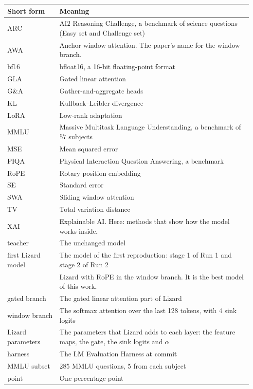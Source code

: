 
\begin{center}
\small
\begin{tabularx}{\linewidth}{@{}lL@{}}
\toprule
\textbf{Short form} & \textbf{Meaning} \\
\midrule
ARC & AI2 Reasoning Challenge, a benchmark of science questions (Easy set and Challenge set) \\
AWA & Anchor window attention. The paper's name for the window branch. \\
bf16 & bfloat16, a 16-bit floating-point format \\
GLA & Gated linear attention \\
G\&A & Gather-and-aggregate heads \\
KL & Kullback--Leibler divergence \\
LoRA & Low-rank adaptation \\
MMLU & Massive Multitask Language Understanding, a benchmark of 57 subjects \\
MSE & Mean squared error \\
PIQA & Physical Interaction Question Answering, a benchmark \\
RoPE & Rotary position embedding \\
SE & Standard error \\
SWA & Sliding window attention \\
TV & Total variation distance \\
XAI & Explainable AI. Here: methods that show how the model works inside. \\
\midrule
teacher & The unchanged model  \\
first Lizard model & The model of the first reproduction: stage 1 of Run 1 and stage 2 of Run 2 \\
 & Lizard with RoPE in the window branch. It is the best model of this work. \\
gated branch & The gated linear attention part of Lizard \\
window branch & The softmax attention over the last 128 tokens, with 4 sink logits \\
Lizard parameters & The parameters that Lizard adds to each layer: the feature maps, the gate, the sink logits and $\alpha$ \\
harness & The LM Evaluation Harness at commit  \\
MMLU subset & 285 MMLU questions, 5 from each subject \\
point & One percentage point \\
\bottomrule
\end{tabularx}
\end{center}
